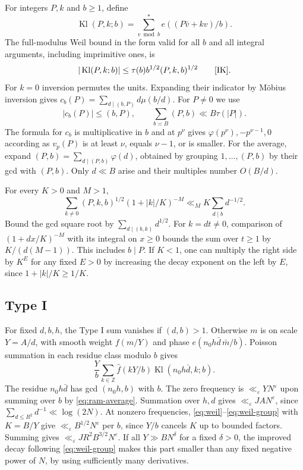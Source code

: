 \documentclass[11pt]{amsart}
\numberwithin{equation}{section}
\theoremstyle{remark}
\begin{document}
For integers \(P,k\) and \(b\ge1\), define
\[
 \operatorname{Kl}(P,k;b)=\sum_{v\bmod b}^{*}e((P\bar v+kv)/b).
\]
The full-modulus Weil bound in the form valid for all \(b\) and all
integral arguments, including imprimitive ones, is
\begin{equation}\label{eq:weil}
 |\operatorname{Kl}(P,k;b)|\le \tau(b)b^{1/2}(P,k,b)^{1/2}
 \qquad\text{\cite[Chapter~11]{IK}}.
\end{equation}
For \(k=0\) inversion permutes the units. Expanding their indicator by
M\"obius inversion gives \(c_b(P)=\sum_{d\mid(b,P)}d\mu(b/d)\).
For \(P\ne0\) we use
\begin{equation}\label{eq:ram-average}
 |c_b(P)|\le(b,P),\qquad
 \sum_{b\asymp B}(P,b)\ll B\tau(|P|).
\end{equation}
The formula for \(c_b\) is multiplicative in \(b\) and at \(p^\nu\)
gives \(\varphi(p^\nu),-p^{\nu-1},0\) according as \(v_p(P)\) is at
least \(\nu\), equals \(\nu-1\), or is smaller. For the average,
expand \((P,b)=\sum_{d\mid(P,b)}\varphi(d)\), obtained by grouping
\(1,\ldots,(P,b)\) by their gcd with \((P,b)\). Only \(d\ll B\) arise
and their multiples number \(O(B/d)\).

For every \(K>0\) and \(M>1\),
\begin{equation}\label{eq:weil-group}
 \sum_{k\ne0}(P,k,b)^{1/2}(1+|k|/K)^{-M}
 \ll_M K\sum_{d\mid b}d^{-1/2}.
\end{equation}
Bound the gcd square root by \(\sum_{d\mid(b,k)}d^{1/2}\). For
\(k=dt\ne0\), comparison of \((1+dx/K)^{-M}\) with its integral on
\(x\ge0\) bounds the sum over \(t\ge1\) by \(K/(d(M-1))\). This
includes \(b\mid P\). If \(K<1\), one can multiply the right side by
\(K^E\) for any fixed \(E>0\) by increasing the decay exponent on the
left by \(E\), since \(1+|k|/K\ge1/K\).

\subsection{Type I}
For fixed \(d,b,h\), the Type I sum vanishes if \((d,b)>1\).
Otherwise \(m\) is on scale \(Y=A/d\), with smooth weight \(f(m/Y)\)
and phase \(e(n_0h\bar d\,\bar m/b)\).
Poisson summation in each residue class modulo \(b\) gives
\[
 \frac{Y}{b}\sum_{k\in\mathbb Z}
   \widehat f(kY/b)\operatorname{Kl}(n_0h\bar d,k;b).
\]
The residue \(n_0h\bar d\) has gcd \((n_0h,b)\) with \(b\).
The zero frequency is \(\ll_\varepsilon YN^\varepsilon\) upon summing
over \(b\) by \eqref{eq:ram-average}. Summation over \(h,d\) gives
\(\ll_\varepsilon JA N^\varepsilon\), since
\(\sum_{d\le R^2}d^{-1}\ll\log(2N)\).
At nonzero frequencies, \eqref{eq:weil}--\eqref{eq:weil-group}
with \(K=B/Y\) give \(\ll_\varepsilon B^{1/2}N^\varepsilon\)
per \(b\), since \(Y/b\) cancels \(K\) up to bounded factors.
Summing gives \(\ll_\varepsilon JR^2 B^{3/2}N^\varepsilon\).
If all \(Y\gg BN^\delta\) for a fixed \(\delta>0\), the improved
decay following \eqref{eq:weil-group} makes this part smaller than any
fixed negative power of \(N\), by using sufficiently many derivatives.
\end{document}
